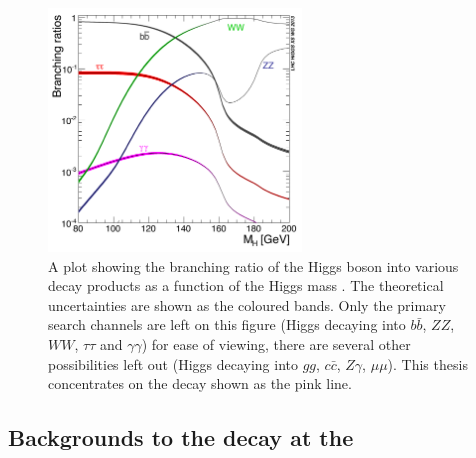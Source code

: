 \begin{figure}
  \includegraphics[width=0.6\textwidth]{theory/plots/Higgs_BR_LM}
  \caption[\SM Higgs branching fraction]{A plot showing the branching ratio of the \SM Higgs boson into various decay products as a function of the Higgs mass \mH. The theoretical uncertainties are shown as the coloured bands. Only the primary search channels are left on this figure (Higgs decaying into $b\bar{b}$, $ZZ$, $WW$, $\tau\tau$ and $\gamma\gamma$) for ease of viewing, there are several other possibilities left out (Higgs decaying into $gg$, $c\bar{c}$, $Z\gamma$, $\mu\mu$). This thesis concentrates on the \Hgg decay shown as the pink line.}
  \label{fig:higgs_br}
\end{figure}

\subsection{Backgrounds to the \Hgg decay at the \LHC}

